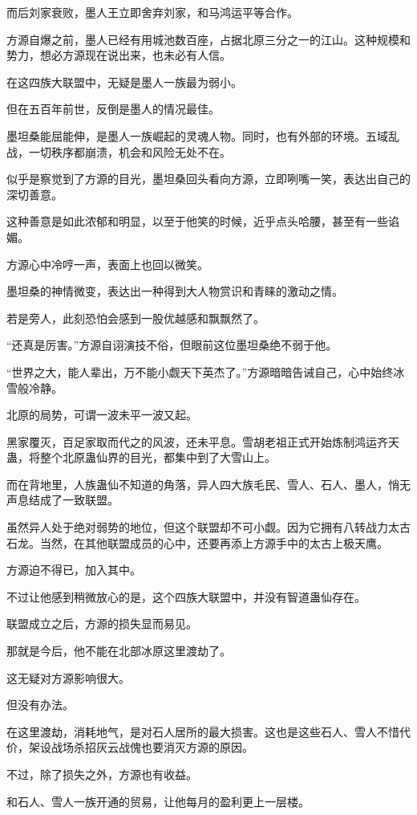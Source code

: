 \begin{this_body}
而后刘家衰败，墨人王立即舍弃刘家，和马鸿运平等合作。

方源自爆之前，墨人已经有用城池数百座，占据北原三分之一的江山。这种规模和势力，想必方源现在说出来，也未必有人信。

在这四族大联盟中，无疑是墨人一族最为弱小。

但在五百年前世，反倒是墨人的情况最佳。

墨坦桑能屈能伸，是墨人一族崛起的灵魂人物。同时，也有外部的环境。五域乱战，一切秩序都崩溃，机会和风险无处不在。

似乎是察觉到了方源的目光，墨坦桑回头看向方源，立即咧嘴一笑，表达出自己的深切善意。

这种善意是如此浓郁和明显，以至于他笑的时候，近乎点头哈腰，甚至有一些谄媚。

方源心中冷哼一声，表面上也回以微笑。

墨坦桑的神情微变，表达出一种得到大人物赏识和青睐的激动之情。

若是旁人，此刻恐怕会感到一股优越感和飘飘然了。

“还真是厉害。”方源自诩演技不俗，但眼前这位墨坦桑绝不弱于他。

“世界之大，能人辈出，万不能小觑天下英杰了。”方源暗暗告诫自己，心中始终冰雪般冷静。

北原的局势，可谓一波未平一波又起。

黑家覆灭，百足家取而代之的风波，还未平息。雪胡老祖正式开始炼制鸿运齐天蛊，将整个北原蛊仙界的目光，都集中到了大雪山上。

而在背地里，人族蛊仙不知道的角落，异人四大族毛民、雪人、石人、墨人，悄无声息结成了一致联盟。

虽然异人处于绝对弱势的地位，但这个联盟却不可小觑。因为它拥有八转战力太古石龙。当然，在其他联盟成员的心中，还要再添上方源手中的太古上极天鹰。

方源迫不得已，加入其中。

不过让他感到稍微放心的是，这个四族大联盟中，并没有智道蛊仙存在。

联盟成立之后，方源的损失显而易见。

那就是今后，他不能在北部冰原这里渡劫了。

这无疑对方源影响很大。

但没有办法。

在这里渡劫，消耗地气，是对石人居所的最大损害。这也是这些石人、雪人不惜代价，架设战场杀招灰云战傀也要消灭方源的原因。

不过，除了损失之外，方源也有收益。

和石人、雪人一族开通的贸易，让他每月的盈利更上一层楼。


\end{this_body}
